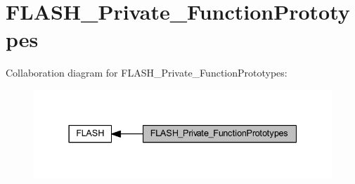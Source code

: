 \hypertarget{group___f_l_a_s_h___private___function_prototypes}{}\section{F\+L\+A\+S\+H\+\_\+\+Private\+\_\+\+Function\+Prototypes}
\label{group___f_l_a_s_h___private___function_prototypes}
Collaboration diagram for F\+L\+A\+S\+H\+\_\+\+Private\+\_\+\+Function\+Prototypes\+:
\nopagebreak
\begin{figure}[H]
\begin{center}
\leavevmode
\includegraphics[width=337pt]{group___f_l_a_s_h___private___function_prototypes}
\end{center}
\end{figure}
